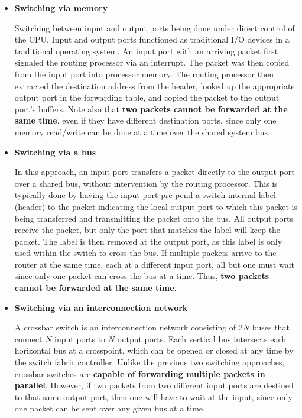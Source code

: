 \documentclass[11pt]{article}
\begin{document}
\begin{itemize}
	\item \textbf{Switching via memory}
	
	Switching between input and output ports being done under direct control of the CPU. Input and output ports functioned as traditional I/O devices in a traditional operating system. An input port with an arriving packet first signaled the routing processor via an interrupt. The packet was then copied from the input port into processor memory. The routing processor then extracted the destination address from the header, looked up the appropriate output port in the forwarding table, and copied the packet to the output port’s buffers. Note also that \textbf{two packets cannot be forwarded at the same time}, even if they have different destination ports, since only one memory read/write can be done at a time over the shared system bus.
	
	\item \textbf{Switching via a bus}
	
	In this approach, an input port transfers a packet directly to the output port over a shared bus, without intervention by the routing processor. This is typically done by having the input port pre-pend a switch-internal label (header) to the packet indicating the local output port to which this packet is being transferred and transmitting the packet onto the bus. All output ports receive the packet, but only the port that matches the label will keep the packet. The label is then removed at the output port, as this label is only used within the switch to cross the bus. If multiple packets arrive to the router at the same time, each at a different input port, all but one must wait since only one packet can cross the bus at a time. Thus,  \textbf{two packets cannot be forwarded at the same time}.
	
	\item \textbf{Switching via an interconnection network}
	
	A crossbar switch is an interconnection network consisting of $2N$ buses that connect $N$ input ports to $N$ output ports. Each vertical bus intersects each horizontal bus at a crosspoint, which can be opened or closed at any time by the switch fabric controller. Unlike the previous two switching approaches, crossbar switches are \textbf{capable of forwarding multiple packets in parallel}. However, if two packets from two different input ports are destined to that same output port, then one will have to wait at the input, since only one packet can be sent over any given bus at a time.
	
\end{itemize}
\end{document}
